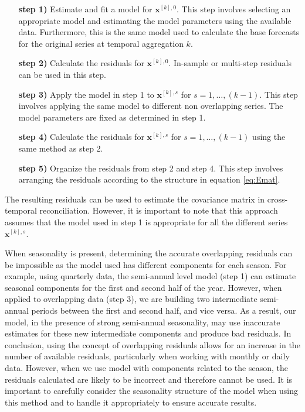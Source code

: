 \documentclass[a4paper,11pt]{article}
\newcommand{\xvet}{\bm{x}}
\theoremstyle{definition}
\begin{document}
\begin{itemize}[leftmargin = 2.5cm, nosep]
	\item[\textbf{step 1)}] Estimate and fit a model for $\xvet^{[k], 0}$. This step involves selecting an appropriate model and estimating the model parameters using the available data. Furthermore, this is the same model used to calculate the base forecasts for the original series at temporal aggregation $k$.
	\item[\textbf{step 2)}] Calculate the residuals for $\xvet^{[k], 0}$. In-sample or multi-step residuals can be used in this step.
	\item[\textbf{step 3)}] Apply the model in step 1 to $\xvet^{[k], s}$ for $s = 1, \dots, (k-1)$. This step involves applying the same model to different non overlapping series. The model parameters are fixed as determined in step 1.
	\item[\textbf{step 4)}] Calculate the residuals for $\xvet^{[k], s}$ for $s = 1, \dots, (k-1)$ using the same method as step 2.
	\item[\textbf{step 5)}] Organize the residuals from step 2 and step 4. This step involves arranging the residuals according to the structure in equation \eqref{eq:Emat}.
\end{itemize}
The resulting residuals can be used to estimate the covariance matrix in cross-temporal reconciliation. However, it is important to note that this approach assumes that the model used in step 1 is appropriate for all the different series $\xvet^{[k], s}$.

When seasonality is present, determining the accurate overlapping residuals can be impossible as the model used has different components for each season. For example, using quarterly data, the semi-annual level model (step 1) can estimate seasonal components for the first and second half of the year. However, when applied to overlapping data (step 3), we are building two intermediate semi-annual periods between the first and second half, and vice versa. As a result, our model, in the presence of strong semi-annual seasonality, may use inaccurate estimates for these new intermediate components and produce bad residuals. In conclusion, using the concept of overlapping residuals allows for an increase in the number of available residuals, particularly when working with monthly or daily data. However, when we use model with components related to the season, the residuals calculated are likely to be incorrect and therefore cannot be used. It is important to carefully consider the seasonality structure of the model when using this method and to handle it appropriately to ensure accurate results.
\end{document}

